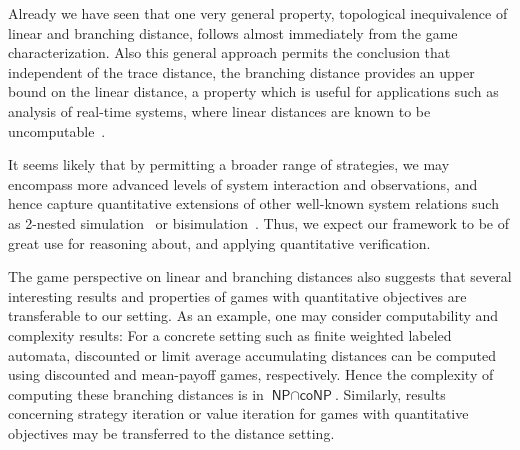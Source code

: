 \documentclass[copyright,creativecommons,sharealike]{eptcs}
\theoremstyle{plain}
\begin{document}
Already we have seen that one very general property, topological
inequivalence of linear and branching distance, follows almost
immediately from the game characterization. Also this general approach
permits the conclusion that independent of the trace distance, the
branching distance provides an upper bound on the linear distance, a
property which is useful for applications such as analysis of
real-time systems, where linear distances are known to be
uncomputable~\cite{journals/jlap/ThraneFL10}.

It seems likely that by permitting a broader range of strategies, we
may encompass more advanced levels of system interaction and
observations, and hence capture quantitative extensions of other
well-known system relations such as 2-nested
simulation~\cite{DBLP:journals/iandc/GrooteV92,DBLP:conf/stacs/AcetoFI01}
or bisimulation~\cite{milner89}.  Thus, we expect our framework to be
of great use for reasoning about, and applying quantitative
verification.

The game perspective on linear and branching distances also suggests
that several interesting results and properties of games with
quantitative objectives are transferable to our setting.  As an
example, one may consider computability and complexity results: For a
concrete setting such as finite weighted labeled automata, discounted
or limit average accumulating distances can be computed using
discounted and mean-payoff games, respectively.  Hence the complexity
of computing these branching distances is in
$\textsf{NP}\cap\textsf{coNP}$.
Similarly, results concerning strategy iteration or value iteration
for games with quantitative objectives may be transferred to the
distance setting.



\end{document}
